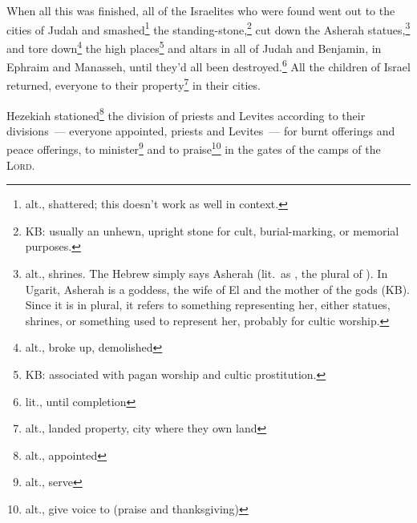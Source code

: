 
\begin{inparaenum}
     When all this was finished, all of the Israelites who were found went out to the cities of Judah and smashed\footnote{alt., shattered; this doesn't work as well in context.} the standing-stone,\footnote{KB: usually an unhewn, upright stone for cult, burial-marking, or memorial purposes.} cut down the Asherah statues,\footnote{alt., shrines. The Hebrew simply says Asherah (lit.\ as , the plural of ). In Ugarit, Asherah is a goddess, the wife of El and the mother of the gods (KB). Since it is in plural, it refers to something representing her, either statues, shrines, or something used to represent her, probably for cultic worship.} and tore down\footnote{alt., broke up, demolished} the high places\footnote{KB: associated with pagan worship and cultic prostitution.} and altars in all of Judah and Benjamin, in Ephraim and Manasseh, until they'd all been destroyed.\footnote{lit., until completion} All the children of Israel returned, everyone to their property\footnote{alt., landed property, city where they own land} in their cities.%
    
     Hezekiah stationed\footnote{alt., appointed} the division of priests and Levites according to their divisions~--- everyone appointed, priests and Levites~--- for burnt offerings and peace offerings, to minister\footnote{alt., serve} and to praise\footnote{alt., give voice to (praise and thanksgiving)} in the gates of the camps of the \textsc{Lord}.%
    

\end{inparaenum}
